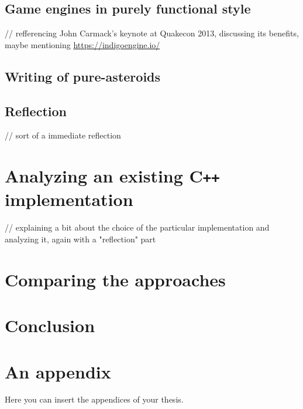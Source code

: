 \documentclass[
  digital, %
  table,   %
  twoside, %
  lof,     %
  lot,     %
]{fithesis3}
\newcommand{\cpp}{C\nolinebreak\texttt{+}\nolinebreak\texttt{+}}
\begin{document}
\section{Game engines in purely functional style}
// refferencing John Carmack's keynote at Quakecon 2013,
discussing its benefits, maybe mentioning \url{https://indigoengine.io/}

\section{Writing of pure-asteroids}

\section{Reflection}
// sort of a immediate reflection



\chapter{Analyzing an existing \cpp{} implementation}
// explaining a bit about the choice of the particular implementation
and analyzing it, again with a "reflection" part

\chapter{Comparing the approaches}



\chapter*{Conclusion}




\printbibliography[heading=bibintoc] %


\makeatletter\thesis@blocks@clear\makeatother
{} %
\printindex


\appendix %
\chapter{An appendix}
Here you can insert the appendices of your thesis.
\end{document}
